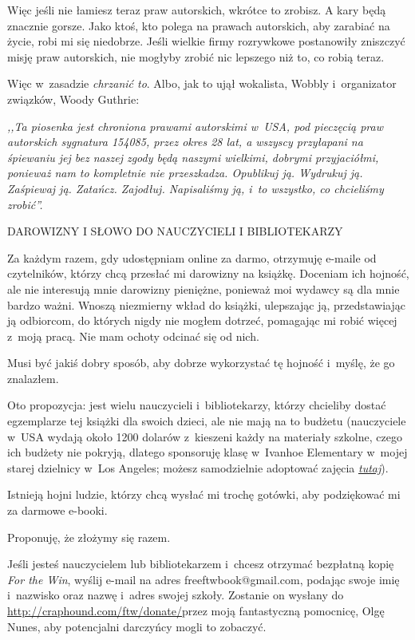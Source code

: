 \documentclass[oneside,polish,11pt,rmheadings]{mwbk}
\begin{document}
Więc jeśli nie łamiesz teraz praw autorskich, wkrótce to zrobisz. A kary będą znacznie gorsze. Jako ktoś, kto polega na prawach autorskich, aby zarabiać na życie, robi mi się niedobrze. Jeśli wielkie firmy rozrywkowe postanowiły zniszczyć misję praw autorskich, nie mogłyby zrobić nic lepszego niż to, co robią teraz. 


Więc w~zasadzie \textit{chrzanić to}. Albo, jak to ujął wokalista, Wobbly i~organizator związków, Woody Guthrie: 

\textit{,,Ta piosenka jest chroniona prawami autorskimi w~USA, pod pieczęcią praw autorskich sygnatura 154085, przez okres 28 lat, a wszyscy przyłapani na śpiewaniu jej bez naszej zgody będą naszymi wielkimi, dobrymi przyjaciółmi, ponieważ nam to kompletnie nie przeszkadza. Opublikuj ją. Wydrukuj ją. Zaśpiewaj ją. Zatańcz. Zajodłuj. Napisaliśmy ją, i~to wszystko, co chcieliśmy zrobić''.}

\bigskip
\noindent DAROWIZNY I SŁOWO DO NAUCZYCIELI I BIBLIOTEKARZY 


Za każdym razem, gdy udostępniam online za darmo, otrzymuję e-maile od czytelników, którzy chcą przesłać mi darowizny na książkę. Doceniam ich hojność, ale nie interesują mnie darowizny pieniężne, ponieważ moi wydawcy są dla mnie bardzo ważni. Wnoszą niezmierny wkład do książki, ulepszając ją, przedstawiając ją odbiorcom, do których nigdy nie mogłem dotrzeć, pomagając mi robić więcej z~moją pracą. Nie mam ochoty odcinać się od nich. 


Musi być jakiś dobry sposób, aby dobrze wykorzystać tę hojność i~myślę, że go znalazłem. 


Oto propozycja: jest wielu nauczycieli i~bibliotekarzy, którzy chcieliby dostać egzemplarze tej książki dla swoich dzieci, ale nie mają na to budżetu (nauczyciele w~USA wydają około 1200 dolarów z~kieszeni każdy na materiały szkolne, czego ich budżety nie pokryją, dlatego sponsoruję klasę w~Ivanhoe Elementary w~mojej starej dzielnicy w~Los Angeles; możesz samodzielnie adoptować zajęcia \href{https://www.adoptaclassroom.org/}{\textit{tutaj}}). 


Istnieją hojni ludzie, którzy chcą wysłać mi trochę gotówki, aby podziękować mi za darmowe e-booki. 


Proponuję, że złożymy się razem. 


Jeśli jesteś nauczycielem lub bibliotekarzem i~chcesz otrzymać bezpłatną kopię \textit{For the Win}, wyślij e-mail na adres freeftwbook@gmail.com, podając swoje imię i~nazwisko oraz nazwę i~adres swojej szkoły. Zostanie on wysłany do \url{http://craphound.com/ftw/donate/}przez moją fantastyczną pomocnicę, Olgę Nunes, aby potencjalni darczyńcy mogli to zobaczyć. 
\end{document}
